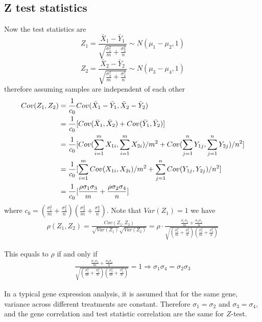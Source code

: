 \documentclass[12pt,oneside]{book}
\begin{document}
\subsection*{Z test statistics}
Now the test statistics are 
\[Z_1 = \frac{\bar{X}_{1}-\bar{Y}_{1} }{\sqrt{\frac{\sigma^2_1}{m} + \frac{\sigma^2_2}{n}}}\sim N(\mu_1-\mu_2, 1)\]
\[Z_2 = \frac{\bar{X}_2-\bar{Y}_2}{\sqrt{\frac{\sigma^2_3}{m} + \frac{\sigma^2_4}{n}}} \sim N(\mu_3-\mu_4, 1)\]
therefore assuming samples are independent of each other
\begin{equation}\notag
\begin{aligned}
Cov(Z_1, Z_2 ) &= \frac{1}{c_0}Cov(\bar{X}_1-\bar{Y}_1, \bar{X}_2-\bar{Y}_2)\\
 & = \frac{1}{c_0}[Cov(\bar{X}_1, \bar{X}_2) + Cov(\bar{Y}_1, \bar{Y}_2)]\\
 & = \frac{1}{c_0}[Cov(\sum_{i=1}^m X_{1i} , \sum_{i=1}^m X_{2i})/m^2 + Cov(\sum_{j=1}^n Y_{1j}, \sum_{j=1}^n Y_{2j})/n^2]\\
 & =  \frac{1}{c_0}[\sum_{i=1}^mCov( X_{1i} ,  X_{2i})/m^2 + \sum_{j=1}^n Cov( Y_{1j},  Y_{2j})/n^2] \\
 & = \frac{1}{c_0}[\frac{\rho\sigma_1\sigma_3 }{m} + \frac{\rho \sigma_2 \sigma_4}{n}]
 \end{aligned}
\end{equation}
where $c_0= \left(\frac{\sigma^2_1}{m} + \frac{\sigma^2_2}{n}\right)\left(\frac{\sigma^2_3}{m} + \frac{\sigma^4_2}{n}\right)$. Note that $Var(Z_1)= 1$
we have 
\begin{align} \label{Z-correlation}
\rho(Z_1, Z_2) = \frac{Cov(Z_1, Z_2)}{\sqrt{Var{(Z_1)}}\sqrt{Var{(Z_2)}}} = \rho \cdot \frac{\frac{\sigma_1\sigma_3 }{m} + \frac{\sigma_2 \sigma_4}{n}}{\sqrt{(\frac{\sigma^2_1}{m} + \frac{\sigma^2_2}{n})(\frac{\sigma^2_3}{m} + \frac{\sigma^2_4}{n})}}
\end{align}

This equals to $\rho $ if and only if
\begin{align}\label{condition}
\frac{\frac{\sigma_1\sigma_3 }{m} + \frac{\sigma_2 \sigma_4}{n}}{\sqrt{(\frac{\sigma^2_1}{m} + \frac{\sigma^2_2}{n})(\frac{\sigma^2_3}{m} + \frac{\sigma^2_4}{n})}} = 1 \Rightarrow \sigma_1\sigma_4= \sigma_2\sigma_3 
\end{align}

 In a typical gene expression analysis, it is assumed that for the same gene, variance across different treatments are constant. Therefore $\sigma_1=\sigma_2$ and $\sigma_3= \sigma_4$, and the gene correlation and test statistic correlation are the same for $Z$-test.
\end{document}
